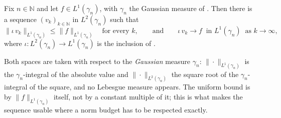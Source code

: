 \begin{lemma}
Fix $n \in \mathbb{N}$ and let $f \in L^1(\gamma_n)$, with $\gamma_n$ the Gaussian
measure of .  Then there is a sequence
$(v_k)_{k \in \mathbb{N}}$ in $L^2(\gamma_n)$ such that
\[
  \|\iota\, v_k\|_{L^1(\gamma_n)} \leq \|f\|_{L^1(\gamma_n)}
  \quad\text{for every } k,
  \qquad\text{and}\qquad
  \iota\, v_k \longrightarrow f \ \text{ in } L^1(\gamma_n)
  \ \text{ as } k \to \infty,
\]
where $\iota : L^2(\gamma_n) \to L^1(\gamma_n)$ is the inclusion of
.

Both spaces are taken with respect to the \emph{Gaussian} measure $\gamma_n$:
$\|\cdot\|_{L^1(\gamma_n)}$ is the $\gamma_n$-integral of the absolute value and
$\|\cdot\|_{L^2(\gamma_n)}$ the square root of the $\gamma_n$-integral of the
square, and no Lebesgue measure appears.  The uniform bound is by
$\|f\|_{L^1(\gamma_n)}$ itself, not by a constant multiple of it; this is what
makes the sequence usable where a norm budget has to be respected exactly.
\end{lemma}
